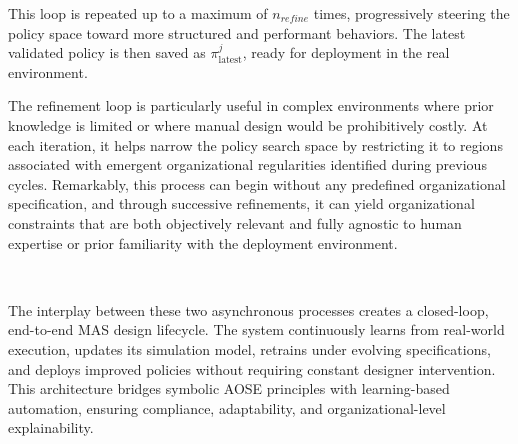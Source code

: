 This loop is repeated up to a maximum of $n_{refine}$ times, progressively steering the policy space toward more structured and performant behaviors. The latest validated policy is then saved as $\pi^j_{\text{latest}}$, ready for deployment in the real environment.

The refinement loop is particularly useful in complex environments where prior knowledge is limited or where manual design would be prohibitively costly. At each iteration, it helps narrow the policy search space by restricting it to regions associated with emergent organizational regularities identified during previous cycles. Remarkably, this process can begin without any predefined organizational specification, and through successive refinements, it can yield organizational constraints that are both objectively relevant and fully agnostic to human expertise or prior familiarity with the deployment environment.

\

\noindent The interplay between these two asynchronous processes creates a closed-loop, end-to-end MAS design lifecycle. The system continuously learns from real-world execution, updates its simulation model, retrains under evolving specifications, and deploys improved policies without requiring constant designer intervention. This architecture bridges symbolic AOSE principles with learning-based automation, ensuring compliance, adaptability, and organizational-level explainability.


